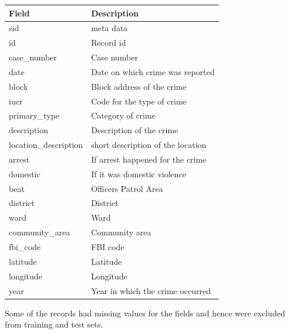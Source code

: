 \documentclass[journal]{IEEEtran}
\begin{document}
\begin{center}
\begin{tabular}{| l | l |}\hline
Field & Description\\ \hline
sid & meta data\\ \hline
id & Record id \\ \hline
case\_number & Case number  \\ \hline
date & Date on which crime was reported \\ \hline
block & Block address of the crime \\ \hline
iucr & Code for the type of crime\\ \hline
primary\_type & Category of crime\\ \hline
description & Description of the crime \\ \hline
location\_description & short description of the location\\ \hline
arrest &  If arrest happened for the crime \\ \hline
domestic & If it was domestic violence \\ \hline
beat & Officers Patrol Area \\ \hline
district & District\\ \hline
ward & Ward \\ \hline
community\_area & Community area\\ \hline
fbi\_code & FBI code\\ \hline
latitude & Latitude \\ \hline
longitude & Longitude \\ \hline
year  &  Year in which the crime occurred\\ \hline
\end{tabular}
\end{center}

Some of the records had missing values for the fields and hence were excluded from training and test sets.
\end{document}
